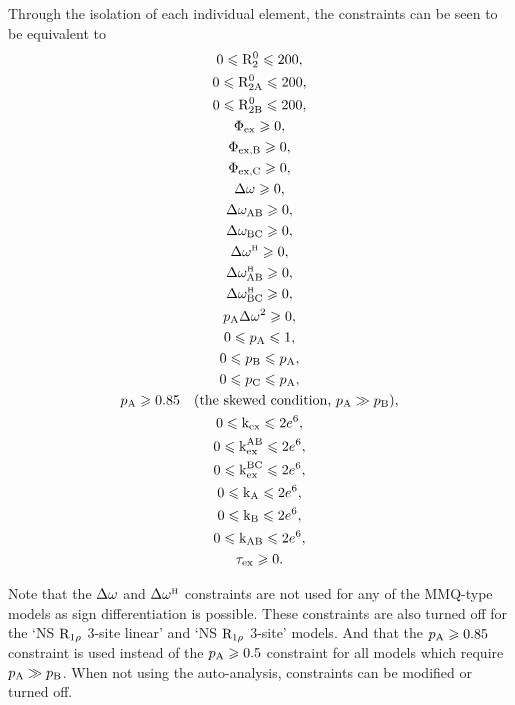 \noindent  Through the isolation of each individual element, the constraints can be seen to be equivalent to
\begin{subequations}
\begin{gather} 
    0 \leqslant \mathrm{R}_2^0 \leqslant 200, \\
    0 \leqslant \mathrm{R}_\mathrm{2A}^0 \leqslant 200, \\
    0 \leqslant \mathrm{R}_\mathrm{2B}^0 \leqslant 200, \\
    \Phi_\textrm{ex} \geqslant 0, \\
    \Phi_\textrm{ex,B} \geqslant 0, \\
    \Phi_\textrm{ex,C} \geqslant 0, \\
    \Delta\omega \geqslant 0, \\
    \Delta\omega_\textrm{AB} \geqslant 0, \\
    \Delta\omega_\textrm{BC} \geqslant 0, \\
    \Delta\omega^{\scriptscriptstyle\mathrm{H}} \geqslant 0, \\
    \Delta\omega^{\scriptscriptstyle\mathrm{H}}_\textrm{AB} \geqslant 0, \\
    \Delta\omega^{\scriptscriptstyle\mathrm{H}}_\textrm{BC} \geqslant 0, \\
    p_\textrm{A}\Delta\omega^2 \geqslant 0, \\
    0 \leqslant p_\textrm{A} \leqslant 1, \\
    0 \leqslant p_\textrm{B} \leqslant p_\textrm{A}, \\
    0 \leqslant p_\textrm{C} \leqslant p_\textrm{A}, \\
    p_\textrm{A} \geqslant 0.85 \quad (\textrm{the skewed condition, } p_\textrm{A} \gg p_\textrm{B}), \\
    0 \leqslant \textrm{k}_\textrm{ex} \leqslant 2e^6, \\
    0 \leqslant \textrm{k}_\textrm{ex}^\textrm{AB} \leqslant 2e^6, \\
    0 \leqslant \textrm{k}_\textrm{ex}^\textrm{BC} \leqslant 2e^6, \\
    0 \leqslant \textrm{k}_\textrm{A} \leqslant 2e^6, \\
    0 \leqslant \textrm{k}_\textrm{B} \leqslant 2e^6, \\
    0 \leqslant \textrm{k}_\textrm{AB} \leqslant 2e^6, \\
    \tau_\textrm{ex} \geqslant 0.
\end{gather} 
\end{subequations}

Note that the $\Delta\omega$ and $\Delta\omega^{\scriptscriptstyle\mathrm{H}}$ constraints are not used for any of the MMQ-type models as sign differentiation is possible.
These constraints are also turned off for the `NS $\mathrm{R}_{1\rho}$ 3-site linear' and `NS $\mathrm{R}_{1\rho}$ 3-site' models.
And that the $p_\textrm{A} \geqslant 0.85$ constraint is used instead of the $p_\textrm{A} \geqslant 0.5$ constraint for all models which require $p_\textrm{A} \gg p_\textrm{B}$.
When not using the auto-analysis, constraints can be modified or turned off.


